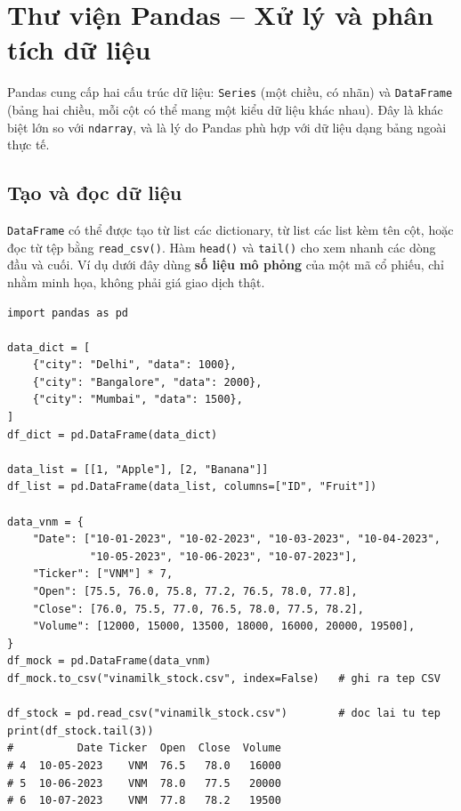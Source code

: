 \section{Thư viện Pandas -- Xử lý và phân tích dữ liệu}

Pandas cung cấp hai cấu trúc dữ liệu: \texttt{Series} (một chiều, có nhãn) và \texttt{DataFrame} (bảng hai chiều, mỗi cột có thể mang một kiểu dữ liệu khác nhau). Đây là khác biệt lớn so với \texttt{ndarray}, và là lý do Pandas phù hợp với dữ liệu dạng bảng ngoài thực tế.

\subsection{Tạo và đọc dữ liệu}
\label{sec:pandas-create}

\texttt{DataFrame} có thể được tạo từ list các dictionary, từ list các list kèm tên cột, hoặc đọc từ tệp bằng \texttt{read\_csv()}. Hàm \texttt{head()} và \texttt{tail()} cho xem nhanh các dòng đầu và cuối. Ví dụ dưới đây dùng \textbf{số liệu mô phỏng} của một mã cổ phiếu, chỉ nhằm minh họa, không phải giá giao dịch thật.

\begin{lstlisting}[caption={Tạo DataFrame, ghi và đọc tệp CSV}]
import pandas as pd

data_dict = [
    {"city": "Delhi", "data": 1000},
    {"city": "Bangalore", "data": 2000},
    {"city": "Mumbai", "data": 1500},
]
df_dict = pd.DataFrame(data_dict)

data_list = [[1, "Apple"], [2, "Banana"]]
df_list = pd.DataFrame(data_list, columns=["ID", "Fruit"])

data_vnm = {
    "Date": ["10-01-2023", "10-02-2023", "10-03-2023", "10-04-2023",
             "10-05-2023", "10-06-2023", "10-07-2023"],
    "Ticker": ["VNM"] * 7,
    "Open": [75.5, 76.0, 75.8, 77.2, 76.5, 78.0, 77.8],
    "Close": [76.0, 75.5, 77.0, 76.5, 78.0, 77.5, 78.2],
    "Volume": [12000, 15000, 13500, 18000, 16000, 20000, 19500],
}
df_mock = pd.DataFrame(data_vnm)
df_mock.to_csv("vinamilk_stock.csv", index=False)   # ghi ra tep CSV

df_stock = pd.read_csv("vinamilk_stock.csv")        # doc lai tu tep
print(df_stock.tail(3))
#          Date Ticker  Open  Close  Volume
# 4  10-05-2023    VNM  76.5   78.0   16000
# 5  10-06-2023    VNM  78.0   77.5   20000
# 6  10-07-2023    VNM  77.8   78.2   19500
\end{lstlisting}

